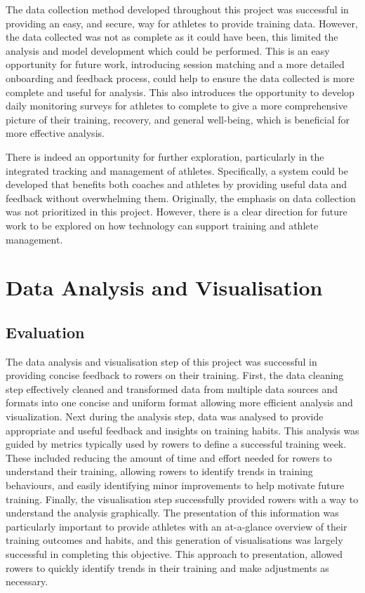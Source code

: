 The data collection method developed throughout this project was successful in providing an easy, and secure, way for athletes to provide training data. However, the data collected was not as complete as it could have been, this limited the analysis and model development which could be performed. This is an easy opportunity for future work, introducing session matching and a more detailed onboarding and feedback process, could help to ensure the data collected is more complete and useful for analysis. This also introduces the opportunity to develop daily monitoring surveys for athletes to complete to give a more comprehensive picture of their training, recovery, and general well-being, which is beneficial for more effective analysis.

There is indeed an opportunity for further exploration, particularly in the integrated tracking and management of athletes. Specifically, a system could be developed that benefits both coaches and athletes by providing useful data and feedback without overwhelming them. Originally, the emphasis on data collection was not prioritized in this project. However, there is a clear direction for future work to be explored on how technology can support training and athlete management.

\section{\label{sec:data-anyl-diss}Data Analysis and Visualisation}
\subsection{Evaluation}
The data analysis and visualisation step of this project was successful in providing concise feedback to rowers on their training. First, the data cleaning step effectively cleaned and transformed data from multiple data sources and formats into one concise and uniform format allowing more efficient analysis and visualization. Next during the analysis step, data was analysed to provide appropriate and useful feedback and insights on training habits. This analysis was guided by metrics typically used by rowers to define a successful training week. These included reducing the amount of time and effort needed for rowers to understand their training, allowing rowers to identify trends in training behaviours, and easily identifying minor improvements to help motivate future training. Finally, the visualisation step successfully provided rowers with a way to understand the analysis graphically. The presentation of this information was particularly important to provide athletes with an at-a-glance overview of their training outcomes and habits, and this generation of visualisations was largely successful in completing this objective. This approach to presentation, allowed rowers to quickly identify trends in their training and make adjustments as necessary.

